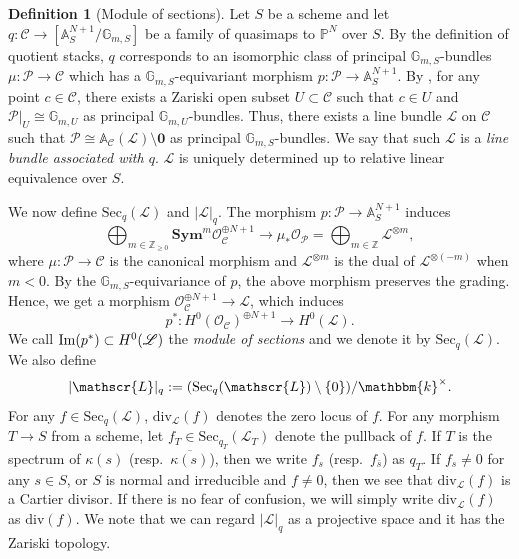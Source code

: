 \documentclass[12pt,twoside]{amsart}
\theoremstyle{definition}
\newtheorem{defn}[thm]{Definition}
\begin{document}
\begin{defn}[Module of sections]\label{defn--linebundle-seq-quasimap}
Let $S$ be a scheme and let $q\colon \mathcal{C}\to [\mathbb{A}_S^{N+1}/\mathbb{G}_{m,S}]$ be a family of quasimaps to $\mathbb{P}^N$ over $S$. 
By the definition of quotient stacks, $q$ corresponds to an isomorphic class of principal $\mathbb{G}_{m, S}$-bundles $\mu\colon\mathcal{P}\to\mathcal{C}$ which has a $\mathbb{G}_{m, S}$-equivariant morphism $p\colon \mathcal{P}\to \mathbb{A}_S^{N+1}$. 
By \cite{Ser}, for any point $c\in\mathcal{C}$, there exists a Zariski open subset $U\subset\mathcal{C}$ such that $c\in U$ and $\mathcal{P}|_U\cong\mathbb{G}_{m,U}$ as principal $\mathbb{G}_{m, U}$-bundles.
Thus, there exists a line bundle $\mathscr{L}$ on $\mathcal{C}$ such that $\mathcal{P}\cong\mathbb{A}_{\mathcal{C}}(\mathscr{L})\setminus\mathbf{0}$ as principal $\mathbb{G}_{m,S}$-bundles. 
We say that such $\mathscr{L}$ is a {\em line bundle associated with $q$}.
$\mathscr{L}$ is uniquely determined up to relative linear equivalence over $S$.

We now define $\mathrm{Sec}_q(\mathscr{L})$ and $|\mathscr{L}|_q$. 
The morphism $p\colon \mathcal{P}\to \mathbb{A}_S^{N+1}$ induces 
$$\bigoplus_{m\in\mathbb{Z}_{\ge0}}\mathbf{Sym}^m\mathcal{O}_{\mathcal{C}}^{\oplus N+1} \to \mu_*\mathcal{O}_{\mathcal{P}}=\bigoplus_{m \in \mathbb{Z}}\mathscr{L}^{\otimes m},$$ where $\mu\colon \mathcal{P}\to \mathcal{C}$ is the canonical morphism and $\mathscr{L}^{\otimes m}$ is the dual of $\mathscr{L}^{\otimes (-m)}$ when $m<0$. 
By the $\mathbb{G}_{m, S}$-equivariance of $p$, the above morphism preserves the grading. 
Hence, we get a morphism $\mathcal{O}_{\mathcal{C}}^{\oplus N+1}\to\mathscr{L}$, which induces 
\[
p^* \colon H^0(\mathcal{O}_{\mathcal{C}})^{\oplus N+1}\to H^0(\mathscr{L}). 
\]
We call ${\rm Im}(p^*) \subset H^0(\mathscr{L})$ the {\it module of sections} and we denote it by $\mathrm{Sec}_q(\mathscr{L})$. 
We also define 
$$|\mathscr{L}|_q:=(\mathrm{Sec}_q(\mathscr{L})\setminus\{0\})/\mathbbm{k}^\times.$$
For any $f\in \mathrm{Sec}_q(\mathscr{L})$, $\mathrm{div}_{\mathscr{L}}(f)$ denotes the zero locus of $f$.
For any morphism $T\to S$ from a scheme, let $f_T\in\mathrm{Sec}_{q_T}(\mathscr{L}_T)$ denote the pullback of $f$.
If $T$ is the spectrum of $\kappa(s)$ (resp.~$\overline{\kappa(s)}$), then we write $f_s$ (resp.~$f_{\bar{s}}$) as $q_T$.
If $f_{s}\ne0$ for any $s\in S$, or $S$ is normal and irreducible and $f\ne0$, then we see that $\mathrm{div}_{\mathscr{L}}(f)$ is a Cartier divisor.
If there is no fear of confusion, we will simply write $\mathrm{div}_{\mathscr{L}}(f)$ as $\mathrm{div}(f)$.
We note that we can regard $|\mathscr{L}|_q$ as a projective space and it has the Zariski topology.



\end{defn}
\end{document}
